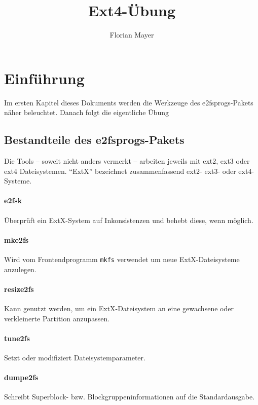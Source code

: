 \documentclass[11pt,a4paper]{article}
\def\inlinebash{\lstinline[style=bash]}
\begin{document}
\title{\color{black} Ext4-Übung}
\author{\color{darkblue} Florian Mayer}
\maketitle

\tableofcontents

\section{Einführung}
Im ersten Kapitel dieses Dokuments werden die 
Werkzeuge des e2fsprogs-Pakets näher beleuchtet.
Danach folgt die eigentliche Übung

\subsection{Bestandteile des e2fsprogs-Pakets}
Die Tools -- soweit nicht anders vermerkt -- arbeiten 
jeweils mit ext2, ext3 oder ext4 Dateisystemen. ``ExtX'' bezeichnet
zusammenfassend ext2- ext3- oder ext4-Systeme.

\paragraph{e2fsk}
	Überprüft ein ExtX-System auf Inkonsistenzen und behebt diese, wenn möglich.

\paragraph{mke2fs}
	Wird vom Frontendprogramm \inlinebash$mkfs$ verwendet um neue ExtX-Dateisysteme anzulegen.

\paragraph{resize2fs}
	Kann genutzt werden, um ein ExtX-Dateisystem an eine gewachsene oder
	verkleinerte Partition anzupassen.

\paragraph{tune2fs}
	Setzt oder modifiziert Dateisystemparameter.

\paragraph{dumpe2fs}
	Schreibt Superblock- bzw. Blockgruppeninformationen auf die Standardausgabe.
\end{document}
